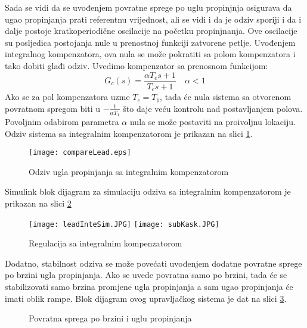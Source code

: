 Sada se vidi da se uvođenjem povratne sprege po uglu propinjnja osigurava da ugao propinjanja prati referentnu 
vrijednost, ali se vidi i da je odziv sporiji  i da i dalje postoje kratkoperiodične oscilacije na početku propinjnanja.
Ove oscilacije su posljedica postojanja nule u prenostnoj funkciji zatvorene petlje. 
Uvođenjem integralnog kompenzatora, ova nula se može pokratiti sa polom kompenzatora i tako dobiti glađi odziv.
Uvedimo kompenzator sa prenosnom funkcijom:
\begin{equation}
    G_c(s) = \frac{\alpha T_cs+1}{T_cs+1}  \quad \alpha<1
\end{equation}
Ako se za pol kompenzatora uzme $T_c = T_1$, tada će nula sistema sa otvorenom 
povratnom spregom biti u $-\frac{1}{\alpha T_1}$ što daje veću kontrolu nad postavljanjem 
polova. Povoljnim odabirom parametra $\alpha$ nula se može postaviti na proivoljnu lokaciju.
Odziv sistema sa integralnim kompenzatorom je prikazan na slici \ref{fig:komp}.
\begin{figure}[!ht]
    \centering
    \texttt{[image: compareLead.eps]}
    \caption{Odziv ugla propinjanja sa integralnim kompenzatorom}
    \label{fig:komp}
\end{figure}
Simulink blok dijagram za simulaciju odziva sa integralnim kompenzatorom je prikazan na 
slici \ref{fig:leadSim}
\begin{figure}[!ht]
    \centering
    \texttt{[image: leadInteSim.JPG]}
    \texttt{[image: subKask.JPG]}
    \caption{Regulacija sa integralnim kompenzatorom}
    \label{fig:leadSim}
\end{figure}
Dodatno, stabilnost odziva se može povećati uvođenjem dodatne povratne sprege po brzini 
ugla propinjanja. Ako se uvede povratna samo po brzini, tada će se stabilizovati samo 
brzina promjene ugla propinjanja a sam ugao propinjanja će imati oblik rampe. 
Blok dijagram ovog upravljačkog sistema je dat na slici \ref{fig:kask}.
\begin{figure}[!ht]
    \centering
\caption{Povratna sprega po brzini i uglu propinjanja}
\label{fig:kask}
\end{figure}
